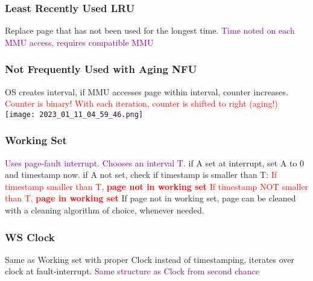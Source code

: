 \documentclass[main.tex,fontsize=7pt,paper=a4,paper=landscape,DIV=calc,]{scrartcl}
\begin{document}
\begin{multicols*}{4}
\subsubsection{Least Recently Used LRU}
Replace page that has not been used for the longest time.\newline
\textcolor{purple}{Time noted on each MMU access, requires compatible MMU}

\subsubsection{Not Frequently Used with Aging NFU}
OS creates interval, if MMU accesses page within interval, counter increases.\newline
\textcolor{red}{Counter is binary! With each iteration, counter is shifted to right (aging!)}\newline
\texttt{[image: 2023\_01\_11\_04\_59\_46.png]}

\subsubsection{Working Set}
\textcolor{purple}{Uses page-fault interrupt. Chooses an interval T.}\newline
if A set at interrupt, set A to 0 and timestamp now.\newline
if A not set, check if timestamp is smaller than T:\newline
\textcolor{red}{If timestamp smaller than T, \textbf{page not in working set}}\newline
\textcolor{red}{If timestamp NOT smaller than T, \textbf{page in working set}}\newline
If page not in working set, page can be cleaned with a cleaning algorithm of choice, whenever needed.

\subsubsection{WS Clock}
Same as Working set with proper Clock instead of timestamping, iterates over clock at fault-interrupt.\newline
\textcolor{purple}{Same structure as Clock from second chance}


\end{multicols*}
\end{document}
